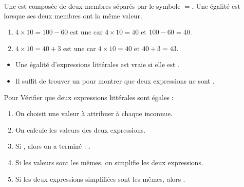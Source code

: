 \documentclass[12pt,a4paper]{article}
\begin{document}
\begin{mydef}
	Une  est composée de deux membres séparés par le symbole $=$.
	Une égalité est  lorsque ses deux membres ont la même valeur.
\end{mydef}


\begin{myexs}
	\begin{enumerate}
		\item $4 \times 10 = 100 - 60$ est une  car $4 \times 10 = 40 $ et $100 - 60 = 40$.
		
		
		\item $4 \times 10 = 40 + 3$ est une  car $4 \times 10 = 40 $ et $40 + 3 = 43$.
	\end{enumerate}
\end{myexs}

\begin{myprops}
	\begin{itemize}
		\item Une égalité d'expressions littérales est vraie si elle est .
		
		\item Il suffit de trouver un  pour montrer que deux expressions ne sont .	
	\end{itemize}	
\end{myprops}


\begin{mymeth}
	Pour Vérifier que deux expressions littérales sont égales :
	
	\begin{enumerate}
		\item On choisit une valeur à attribuer à chaque inconnue.
		\item On calcule les valeurs des deux expressions.
		\item Si , alors on a terminé : .
		\item Si les valeurs sont les mêmes, on simplifie les deux expressions.
		\item Si les deux expressions simplifiées sont les mêmes, alors .
	\end{enumerate} 
\end{mymeth}
\end{document}

